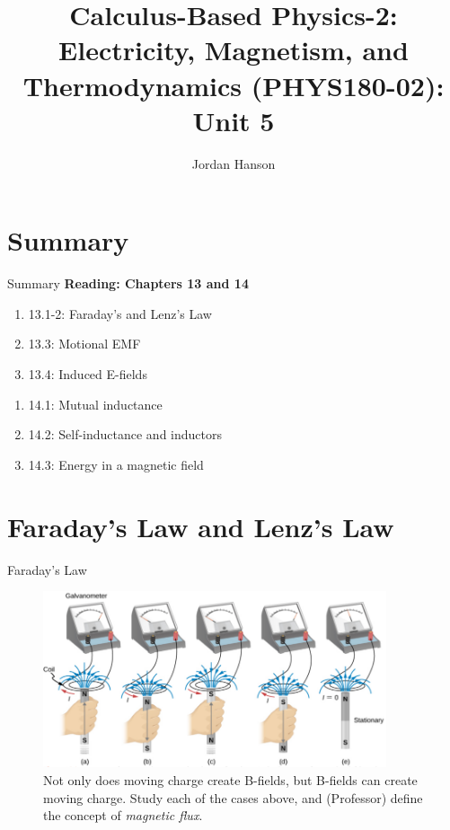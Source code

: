 \documentclass{beamer}
\title{Calculus-Based Physics-2: Electricity, Magnetism, and Thermodynamics (PHYS180-02): Unit 5}
\author{Jordan Hanson}
\institute{Whittier College Department of Physics and Astronomy}
\begin{document}
\maketitle

\section{Summary}

\begin{frame}{Summary}
\textbf{Reading: Chapters 13 and 14} \\ \vspace{0.5cm}
\begin{enumerate}
\item 13.1-2: Faraday's and Lenz's Law
\item 13.3: Motional EMF
\item 13.4: Induced E-fields
\end{enumerate}
\begin{enumerate}
\item 14.1: Mutual inductance
\item 14.2: Self-inductance and inductors
\item 14.3: Energy in a magnetic field
\end{enumerate}
\end{frame}

\section{Faraday's Law and Lenz's Law}

\begin{frame}{Faraday's Law}
\begin{figure}
\centering
\includegraphics[width=0.9\textwidth]{figures/farad.png}
\caption{\label{fig:farad1} Not only does moving charge create B-fields, but B-fields can create moving charge.  Study each of the cases above, and (Professor) define the concept of \textit{magnetic flux}.}
\end{figure}
\end{frame}
\end{document}
